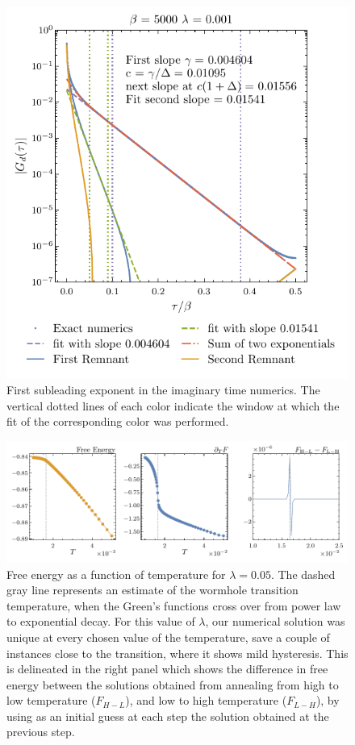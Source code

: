 \begin{figure}[!t]
    \centering
    \includegraphics[width=0.75\linewidth]{figures/chapter3/ExponentsGD.pdf}%
    \caption{First subleading exponent in the imaginary time numerics. The vertical dotted lines of each color indicate the window at which the fit of the corresponding color was performed.}
    \label{fig:subleadingexponentGD}
\end{figure}

\begin{figure}[!t]
    \centering
    \includegraphics[width=0.95\linewidth]{figures/chapter3/ButterFlyPlot.pdf}
    \caption{Free energy as a function of temperature for $\lambda = 0.05$. The dashed gray line represents an estimate of the wormhole transition temperature, when the Green's functions cross over from power law to exponential decay. For this value of $\lambda$, our numerical solution was unique at every chosen value of the temperature, save a couple of instances close to the transition, where it shows mild hysteresis. This is delineated in the right panel which shows the difference in free energy between the solutions obtained from annealing from high to low temperature ($F_{H-L}$), and low to high temperature ($F_{L-H}$), by using as an initial guess at each step the solution obtained at the previous step.
    }
    \label{fig:butterflyplotmetal}
\end{figure}

